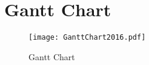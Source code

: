 \appendixpagenumbering
\chapter{Gantt Chart} \label{App:Gantt}

\begin{figure}[H]
\centerline{\texttt{[image: GanttChart2016.pdf]}}
\caption[]{Gantt Chart}
\label{fig:Gantt}
\end{figure}
